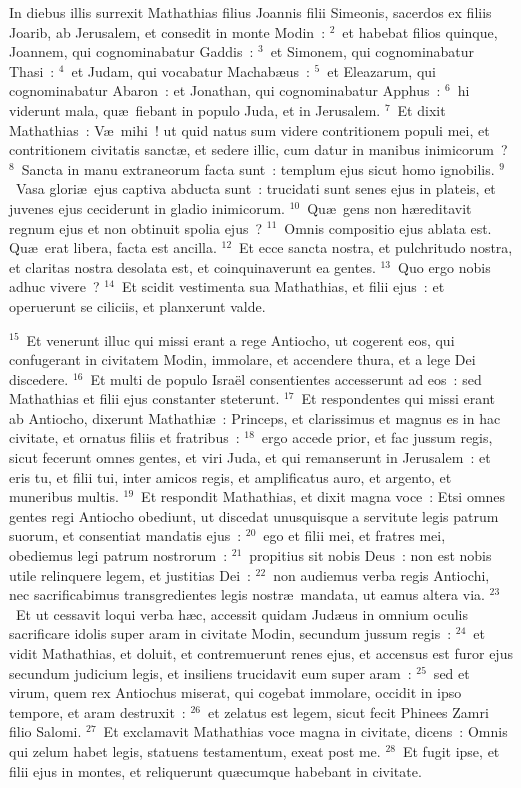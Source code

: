 \lettrine[lines=3,image=true,loversize=0.05,lraise=-0.03]{I}{}n diebus illis surrexit Mathathias filius Joannis filii Simeonis, sacerdos ex filiis Joarib, ab Jerusalem, et consedit in monte Modin~:
${}^{2}$~et habebat filios quinque, Joannem, qui cognominabatur Gaddis~:
${}^{3}$~et Simonem, qui cognominabatur Thasi~:
${}^{4}$~et Judam, qui vocabatur Machab\ae us~:
${}^{5}$~et Eleazarum, qui cognominabatur Abaron~: et Jonathan, qui cognominabatur Apphus~:
${}^{6}$~hi viderunt mala, qu\ae\ fiebant in populo Juda, et in Jerusalem.
${}^{7}$~Et dixit Mathathias~: V\ae\ mihi~! ut quid natus sum videre contritionem populi mei, et contritionem civitatis sanct\ae , et sedere illic, cum datur in manibus inimicorum~?
${}^{8}$~Sancta in manu extraneorum facta sunt~: templum ejus sicut homo ignobilis.
${}^{9}$~Vasa glori\ae\ ejus captiva abducta sunt~: trucidati sunt senes ejus in plateis, et juvenes ejus ceciderunt in gladio inimicorum.
${}^{10}$~Qu\ae\ gens non h\ae reditavit regnum ejus et non obtinuit spolia ejus~?
${}^{11}$~Omnis compositio ejus ablata est. Qu\ae\ erat libera, facta est ancilla.
${}^{12}$~Et ecce sancta nostra, et pulchritudo nostra, et claritas nostra desolata est, et coinquinaverunt ea gentes.
${}^{13}$~Quo ergo nobis adhuc vivere~?
${}^{14}$~Et scidit vestimenta sua Mathathias, et filii ejus~: et operuerunt se ciliciis, et planxerunt valde.


${}^{15}$~Et venerunt illuc qui missi erant a rege Antiocho, ut cogerent eos, qui confugerant in civitatem Modin, immolare, et accendere thura, et a lege Dei discedere.
${}^{16}$~Et multi de populo Isra\"el consentientes accesserunt ad eos~: sed Mathathias et filii ejus constanter steterunt.
${}^{17}$~Et respondentes qui missi erant ab Antiocho, dixerunt Mathathi\ae~: Princeps, et clarissimus et magnus es in hac civitate, et ornatus filiis et fratribus~:
${}^{18}$~ergo accede prior, et fac jussum regis, sicut fecerunt omnes gentes, et viri Juda, et qui remanserunt in Jerusalem~: et eris tu, et filii tui, inter amicos regis, et amplificatus auro, et argento, et muneribus multis.
${}^{19}$~Et respondit Mathathias, et dixit magna voce~: Etsi omnes gentes regi Antiocho obediunt, ut discedat unusquisque a servitute legis patrum suorum, et consentiat mandatis ejus~:
${}^{20}$~ego et filii mei, et fratres mei, obediemus legi patrum nostrorum~:
${}^{21}$~propitius sit nobis Deus~: non est nobis utile relinquere legem, et justitias Dei~:
${}^{22}$~non audiemus verba regis Antiochi, nec sacrificabimus transgredientes legis nostr\ae\ mandata, ut eamus altera via.
${}^{23}$~Et ut cessavit loqui verba h\ae c, accessit quidam Jud\ae us in omnium oculis sacrificare idolis super aram in civitate Modin, secundum jussum regis~:
${}^{24}$~et vidit Mathathias, et doluit, et contremuerunt renes ejus, et accensus est furor ejus secundum judicium legis, et insiliens trucidavit eum super aram~:
${}^{25}$~sed et virum, quem rex Antiochus miserat, qui cogebat immolare, occidit in ipso tempore, et aram destruxit~:
${}^{26}$~et zelatus est legem, sicut fecit Phinees Zamri filio Salomi.
${}^{27}$~Et exclamavit Mathathias voce magna in civitate, dicens~: Omnis qui zelum habet legis, statuens testamentum, exeat post me.
${}^{28}$~Et fugit ipse, et filii ejus in montes, et reliquerunt qu\ae cumque habebant in civitate.


